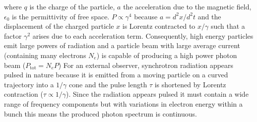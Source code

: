 \documentclass[../main.tex]{subfiles}
\begin{document}
where $q$ is the charge of the particle, $a$ the acceleration due to the magnetic field, $\epsilon_{0}$ is the permittivity of free space. $P \propto \gamma^{4}$ because $a = d^{2}x/d^{2}t$ and the displacement of the charged particle $x$ is Lorentz contracted to $x/\gamma$ such that a factor $\gamma^{2}$ arises due to each acceleration term. Consequently, high energy particles emit large powers of radiation and a particle beam with large average current (containing many electrons $N_{e}$) is capable of producing a high power photon beam ($P_{\mathrm{tot}}=N_{e}P$) For an external observer, synchrotron radiation appears pulsed in nature because it is emitted from a moving particle on a curved trajectory into a $1/\gamma$ cone and the pulse length $\tau$ is shortened by Lorentz contraction ($\tau \propto 1/\gamma$). Since the radiation appears pulsed it must contain a wide range of frequency components \cite{appleby2020science} but with variations in electron energy within a bunch this means the produced photon spectrum is continuous.  
\end{document}
